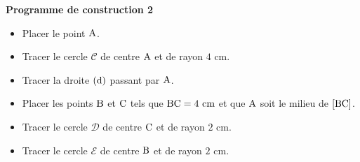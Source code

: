 \documentclass[exercice,a4]{thedocument}%
\begin{document}
%
\noindent\textbf{Programme de construction 2}\par\smallskip\noindent
\begin{itemize}
    \item Placer le point $\text{A}$.
    \item Tracer le cercle $\mathcal{C}$ de centre $\text{A}$ et de
    rayon $4\text{ cm}$.
    \item Tracer la droite $(\text{d})$ passant par $\text{A}$.
    \item Placer les points $\text{B}$ et $\text{C}$ tels que
    $\text{BC}=4\text{ cm}$ et que $\text{A}$ soit le milieu
    de $[\text{BC}]$.
    \item Tracer le cercle $\mathcal{D}$ de centre $\text{C}$ et de
    rayon $2\text{ cm}$.
    \item Tracer le cercle $\mathcal{E}$ de centre $\text{B}$ et de
    rayon $2\text{ cm}$.
\end{itemize}
\end{document}
